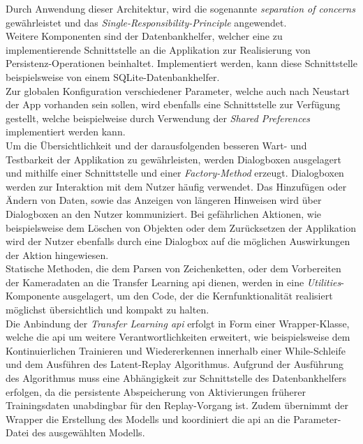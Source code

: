 \documentclass[oneside]{ausarbeitung}
\begin{document}
Durch Anwendung dieser Architektur, wird die sogenannte \textit{separation of concerns} gewährleistet und das \textit{Single-Responsibility-Principle} angewendet.\\
Weitere Komponenten sind der Datenbankhelfer, welcher eine zu implementierende Schnittstelle an die Applikation zur Realisierung von Persistenz-Operationen beinhaltet. Implementiert werden, kann diese Schnittstelle beispielsweise von einem SQLite-Datenbankhelfer.\\
Zur globalen Konfiguration verschiedener Parameter, welche auch nach Neustart der App vorhanden sein sollen, wird ebenfalls eine Schnittstelle zur Verfügung gestellt, welche beispielweise durch Verwendung der \textit{Shared Preferences} implementiert werden kann.\\
Um die Übersichtlichkeit und der darausfolgenden besseren Wart- und Testbarkeit der Applikation zu gewährleisten, werden Dialogboxen ausgelagert und mithilfe einer Schnittstelle und einer \textit{Factory-Method} erzeugt. Dialogboxen werden zur Interaktion mit dem Nutzer häufig verwendet. Das Hinzufügen oder Ändern von Daten, sowie das Anzeigen von längeren Hinweisen wird über Dialogboxen an den Nutzer kommuniziert. Bei gefährlichen Aktionen, wie beispielsweise dem Löschen von Objekten oder dem Zurücksetzen der Applikation wird der Nutzer ebenfalls durch eine Dialogbox auf die möglichen Auswirkungen der Aktion hingewiesen.\\
Statische Methoden, die dem Parsen von Zeichenketten, oder dem Vorbereiten der Kameradaten an die Transfer Learning \ac{api} dienen, werden in eine \textit{Utilities}-Komponente ausgelagert, um den Code, der die Kernfunktionalität realisiert möglichst übersichtlich und kompakt zu halten.\\
Die Anbindung der \textit{Transfer Learning \ac{api}} erfolgt in Form einer Wrapper-Klasse, welche die \ac{api} um weitere Verantwortlichkeiten erweitert, wie beispielsweise dem Kontinuierlichen Trainieren und Wiedererkennen innerhalb einer While-Schleife und dem Ausführen des Latent-Replay Algorithmus. Aufgrund der Ausführung des Algorithmus muss eine Abhängigkeit zur Schnittstelle des Datenbankhelfers erfolgen, da die persistente Abspeicherung von Aktivierungen früherer Trainingsdaten unabdingbar für den Replay-Vorgang ist. Zudem übernimmt der Wrapper die Erstellung des Modells und koordiniert die \ac{api} an die Parameter-Datei des ausgewählten Modells.
\end{document}
